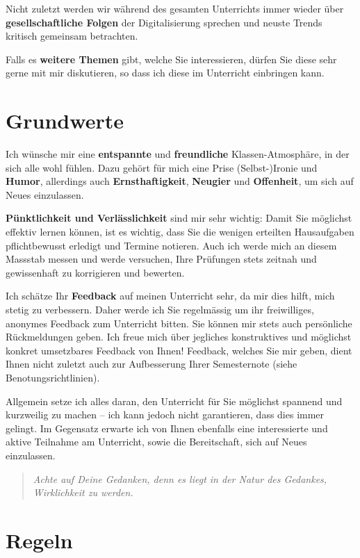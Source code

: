 Nicht zuletzt werden wir während des gesamten Unterrichts immer wieder über \textbf{gesellschaftliche Folgen} der Digitalisierung sprechen und neuste Trends kritisch gemeinsam betrachten.

Falls es \textbf{weitere Themen} gibt, welche Sie interessieren, dürfen Sie diese sehr gerne mit mir diskutieren, so dass ich diese im Unterricht einbringen kann.

\section*{\textcolor{FDUteal}{Grundwerte}}
Ich wünsche mir eine \textbf{entspannte} und \textbf{freundliche} Klassen-Atmosphäre, in der sich alle wohl fühlen. Dazu gehört für mich eine Prise (Selbst-)Ironie und \textbf{Humor}, allerdings auch \textbf{Ernsthaftigkeit}, \textbf{Neugier} und \textbf{Offenheit}, um sich auf Neues einzulassen.

\textbf{Pünktlichkeit und Verlässlichkeit} sind mir sehr wichtig: Damit Sie möglichst effektiv lernen können, ist es wichtig, dass Sie die wenigen erteilten Hausaufgaben pflichtbewusst erledigt und Termine notieren. Auch ich werde mich an diesem Massstab messen und werde versuchen, Ihre Prüfungen stets zeitnah und gewissenhaft zu korrigieren und bewerten.

Ich schätze Ihr \textbf{Feedback} auf meinen Unterricht sehr, da mir dies hilft, mich stetig zu verbessern. Daher werde ich Sie regelmässig um ihr freiwilliges, anonymes Feedback zum Unterricht bitten. Sie können mir stets auch persönliche Rückmeldungen geben. Ich freue mich über jegliches konstruktives und möglichst konkret umsetzbares Feedback von Ihnen! Feedback, welches Sie mir geben, dient Ihnen nicht zuletzt auch zur Aufbesserung Ihrer Semesternote (siehe Benotungsrichtlinien).

Allgemein setze ich alles daran, den Unterricht für Sie möglichst spannend und kurzweilig zu machen -- ich kann jedoch nicht garantieren, dass dies immer gelingt. Im Gegensatz erwarte ich von Ihnen ebenfalls eine interessierte und aktive Teilnahme am Unterricht, sowie die Bereitschaft, sich auf Neues einzulassen.

\begin{quote}
\textit{Achte auf Deine Gedanken, denn es liegt in der Natur des Gedankes, Wirklichkeit zu werden.}
\end{quote}

\section*{\textcolor{FDUteal}{Regeln}}

